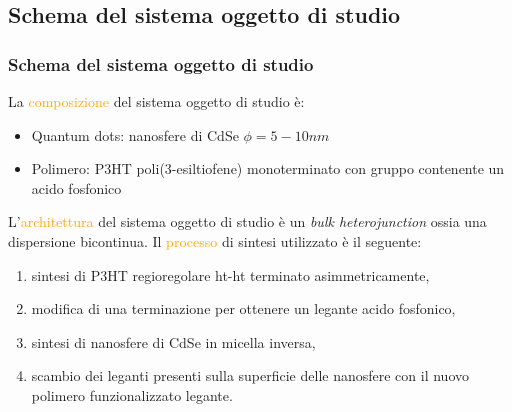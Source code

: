 \documentclass{beamer}
\begin{document}
  \subsection{Schema del sistema oggetto di studio}
    \begin{frame}
      \frametitle{ 
 Schema del sistema oggetto di studio}
	La \textcolor{orange}{composizione} del sistema oggetto di studio è:
	\begin{itemize}
	  \item Quantum dots: nanosfere di CdSe $\phi = 5 - 10 nm$
	  \item Polimero: P3HT poli(3-esiltiofene) monoterminato con gruppo contenente un acido fosfonico
	\end{itemize}\pause
	L'\textcolor{orange}{architettura} del sistema oggetto di studio è un \emph{bulk heterojunction} ossia una dispersione bicontinua.
	\pause Il \textcolor{orange}{processo} di sintesi utilizzato è il seguente:
	\begin{enumerate}
	 \item sintesi di P3HT regioregolare ht-ht terminato asimmetricamente,
	 \item modifica di una terminazione per ottenere un legante acido fosfonico,
	 \item sintesi di nanosfere di CdSe in micella inversa,
	 \item scambio dei leganti presenti sulla superficie delle nanosfere con il nuovo polimero funzionalizzato legante.
	\end{enumerate}
    \end{frame}
\end{document}
